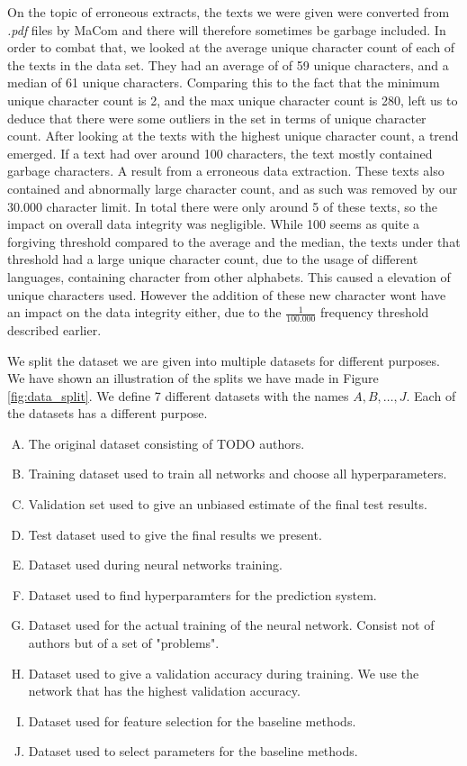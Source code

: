 On the topic of erroneous extracts, the texts we were given were converted from
\textit{.pdf} files by MaCom and there will therefore sometimes be garbage
included. In order to combat that, we looked at the average unique character
count of each of the texts in the data set. They had an average of of 59 unique
characters, and a median of 61 unique characters. Comparing this to the fact
that the minimum unique character count is 2, and the max unique character count
is 280, left us to deduce that there were some outliers in the set in terms
of unique character count. After looking at the texts with the highest unique
character count, a trend emerged. If a text had over around 100 characters,
the text mostly contained garbage characters. A result from a erroneous data
extraction. These texts also contained and abnormally large character count,
and as such was removed by our 30.000 character limit. In total there were only
around 5 of these texts, so the impact on overall data integrity was negligible.
While 100 seems as quite a forgiving threshold compared to the average and the
median, the texts under that threshold had a large unique character count, due
to the usage of different languages, containing character from other alphabets.
This caused a elevation of unique characters used. However the addition of these
new character wont have an impact on the data integrity either, due to the
$\frac{1}{100.000}$ frequency threshold described earlier.

We split the dataset we are given into multiple datasets for different
purposes. We have shown an illustration of the splits we have made in Figure
\ref{fig:data_split}. We define 7 different datasets with the names $A, B,
\dots, J$. Each of the datasets has a different purpose.

\begin{enumerate}[A)]
    \item The original dataset consisting of TODO authors.
    \item Training dataset used to train all networks and choose all
        hyperparameters.
    \item Validation set used to give an unbiased estimate of the final test
        results.
    \item Test dataset used to give the final results we present.
    \item Dataset used during neural networks training.
    \item Dataset used to find hyperparamters for the prediction system.
    \item Dataset used for the actual training of the neural network. Consist
        not of authors but of a set of "problems".
    \item Dataset used to give a validation accuracy during training. We use the
        network that has the highest validation accuracy.
    \item Dataset used for feature selection for the baseline methods.
    \item Dataset used to select parameters for the baseline methods.
\end{enumerate}

